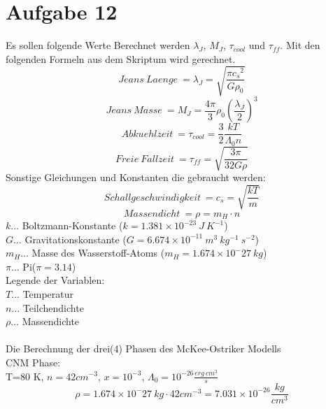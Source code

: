\section{Aufgabe 12}
Es sollen folgende Werte Berechnet werden $\lambda_J$, $M_J$, $\tau_{cool}$ und $\tau_{ff}$. Mit den folgenden Formeln aus dem Skriptum wird gerechnet.
\begin{equation}{Jeans ~ Laenge ~ }
= \lambda_{J}=\sqrt{\frac{\pi {c_s}^2}{G \rho_0}}
\end{equation}
\begin{equation}{Jeans ~ Masse ~ }
= M_{J}=\frac{4 \pi}{3} \rho_0 \left ( \frac{\lambda_J}{2} \right)^3
\end{equation}
\begin{equation}{Abkuehlzeit ~ }
= \tau_{cool}=\frac{3}{2} \frac{k T}{\Lambda_0 n}
\end{equation}
\begin{equation}{Freie ~ Fallzeit ~ }
= \tau_{ff}=\sqrt{\frac{3 \pi}{32 G \rho}}
\end{equation}
Sonstige Gleichungen und Konstanten die gebraucht werden:
\begin{equation}{Schallgeschwindigkeit ~ }
= c_{s}=\sqrt{\frac{k T}{m}}
\end{equation}
\begin{equation}{Massendicht ~ }
= \rho=m_H \cdot n
\end{equation}
\(k\dots\) Boltzmann-Konstante (\(k = 1.381 \times 10^{-23}~J~K^{-1}\))\\
\(G\dots\) Gravitationskonstante (\(G = 6.674 \times 10^{-11}~m^3~kg^{-1}~s^{-2}\))\\
\(m_H\dots\) Masse des Wasserstoff-Atoms (\(m_H = 1.674 \times 10^-27~kg\))\\
\(\pi\dots\) Pi(\(\pi=3.14\))\\
Legende der Variablen:\\
\(T\dots\) Temperatur\\
\(n\dots\) Teilchendichte\\
\(\rho\dots\) Massendichte\\
\\
Die Berechnung der drei(4) Phasen des McKee-Ostriker Modells \\
CNM Phase: \\
T=80 K, $n = 42 cm^{-3}$, $x=10^{-3}$, $\Lambda_0 = 10^{-26} \frac{erg~cm^3}{s}$\\
\begin{equation}
\rho=1.674 \times 10^-27~kg \cdot 42 cm^{-3} = 7.031 \times 10^{-26} \frac{kg}{cm^3}
\end{equation}
